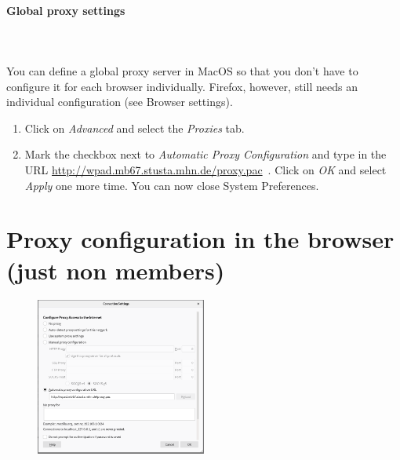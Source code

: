 \documentclass[a4paper,12pt]{scrartcl}
\begin{document}
\paragraph*{Global proxy settings}~\\
\\
You can define a global proxy server in MacOS so that you don't have to configure it for each browser individually. Firefox, however, still needs an individual configuration (see Browser settings).
\begin{enumerate}
	\item Click on \emph{Advanced} and select the \emph{Proxies} tab.
	\item Mark the checkbox next to \emph{Automatic Proxy Configuration} and type in the URL \url{http://wpad.mb67.stusta.mhn.de/proxy.pac}\ . Click on \emph{OK} and select \emph{Apply} one more time. You can now close System Preferences.
\end{enumerate}

\newpage

\section*{Proxy configuration in the browser (just non members)}

\begin{figure}
	\vspace{-40pt}
	\begin{center}
		\includegraphics[width=0.5\textwidth,keepaspectratio]{Bilder/firefox_en_mb}
	\end{center}
\end{figure}
\end{document}
